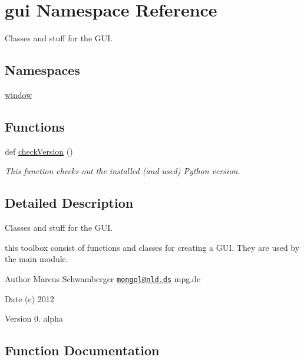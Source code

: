 \hypertarget{namespacegui}{}\section{gui Namespace Reference}
\label{namespacegui}


Classes and stuff for the G\+UI.  


\subsection*{Namespaces}
\begin{DoxyCompactItemize}
\item 
 \hyperlink{namespacegui_1_1window}{window}
\end{DoxyCompactItemize}
\subsection*{Functions}
\begin{DoxyCompactItemize}
\item 
def \hyperlink{namespacegui_a37b31e71da0c76180282154d702cfecb}{check\+Version} ()
\begin{DoxyCompactList}\small\item\em This function checks out the installed (and used) Python version. \end{DoxyCompactList}\end{DoxyCompactItemize}


\subsection{Detailed Description}
Classes and stuff for the G\+UI. 

this toolbox consist of functions and classes for creating a G\+UI. They are used by the main module.

\begin{DoxyAuthor}{Author}
Marcus Schwamberger  \href{mailto:mongol@nld.ds}{\tt mongol@nld.\+ds} mpg.\+de 
\end{DoxyAuthor}
\begin{DoxyDate}{Date}
(c) 2012 
\end{DoxyDate}
\begin{DoxyVersion}{Version}
0. alpha 
\end{DoxyVersion}


\subsection{Function Documentation}
